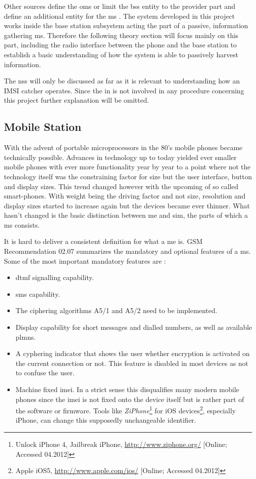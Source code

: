 Other sources define the \gls{oms} \cite{GSM2009} or limit the \gls{bss} entity to the provider part and define an additional entity for the \gls{ms} \cite{overview1994, overview1996}.
The system developed in this project works inside the base station subsystem acting the part of a passive, information gathering \gls{ms}.
Therefore the following theory section will focus mainly on this part, including the radio interface between the phone and the base station to establish a basic understanding of how the system is able to passively harvest information.

The \gls{nss} will only be discussed as far as it is relevant to understanding how an IMSI catcher operates.
Since the \gls{in} is not involved in any procedure concerning this project further explanation will be omitted.

\subsection{Mobile Station}
\label{sec:ms}
With the advent of portable microprocessors in the 80's mobile phones became technically possible.
Advances in technology up to today yielded ever smaller mobile phones with ever more functionality year by year to a point where not the technology itself was the constraining factor for size but the user interface, \eg button and display sizes.
This trend changed however with the upcoming of so called smart-phones. 
With weight being the driving factor and not size, resolution and display sizes started to increase again but the devices became ever thinner.
What hasn't changed is the basic distinction between \gls{me} and \gls{sim}, the parts of which a \gls{ms} consists.

It is hard to deliver a consistent definition for what a \gls{me} is.
GSM Recommendation 02.07 \cite{GSM0207} summarizes the mandatory and optional features of a \gls{ms}.
Some of the most important mandatory features are \cite{protocols1999}:
\begin{itemize}
	\item \gls{dtmf} signalling capability.
	\item \gls{sms} capability.
	\item The ciphering algorithms A5/1 and A5/2 need to be implemented.
	\item Display capability for short messages and dialled numbers, as well as available \glspl{plmn}.
	\item A cyphering indicator that shows the user whether encryption is activated on the current connection or not.
	This feature is disabled in most devices as not to confuse the user.
	\item Machine fixed \gls{imei}.
	In a strict sense this disqualifies many modern mobile phones since the \gls{imei} is not fixed onto the device itself but is rather part of the software or firmware.
	Tools like \emph{ZiPhone}\footnote{Unlock iPhone 4, Jailbreak iPhone, \url{http://www.ziphone.org/} [Online; Accessed 04.2012]} for iOS devices\footnote{Apple iOS5, \url{http://www.apple.com/ios/} [Online; Accessed 04.2012]}, especially iPhone, can change this supposedly unchangeable identifier.
\end{itemize}

